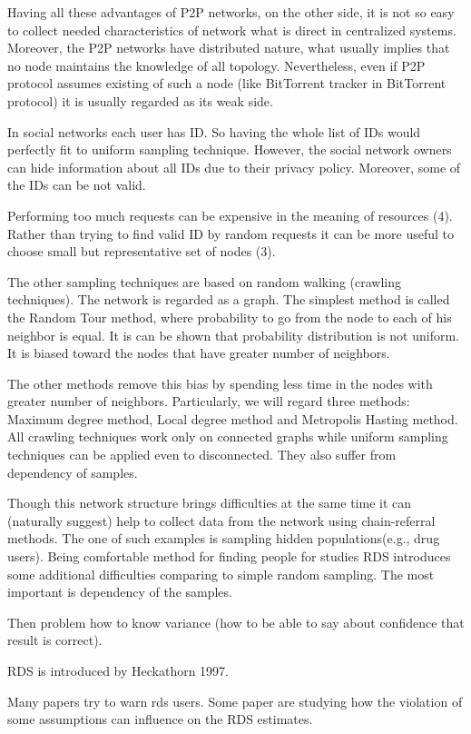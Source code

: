 \documentclass[12pt]{report}
\begin{document}
Having all these advantages of P2P networks, on the other side, it is not so easy to collect needed characteristics of network what is direct in centralized systems. Moreover, the P2P networks have distributed nature, what usually implies that no node maintains the knowledge of all topology. Nevertheless, even if P2P protocol assumes existing of such a node (like BitTorrent tracker in BitTorrent protocol) it is usually regarded as its weak side. 

In social networks each user has ID. So having the whole list of IDs would perfectly fit to uniform sampling technique. However, the social network owners can hide information about all IDs due to their privacy policy. Moreover, some of the IDs can be not valid. 

Performing too much requests can be expensive in the meaning of resources (4). Rather than trying to find valid ID by random requests it can be more useful to choose small but representative set of nodes (3).

The other sampling techniques are based on random walking (crawling techniques). The network is regarded as a graph. The simplest method is called the Random Tour method, where probability to go from the node to each of his neighbor is equal. It is can be shown that probability distribution is not uniform. It is biased toward the nodes that have greater number of neighbors. 

The other methods remove this bias by spending less time in the nodes with greater number of neighbors. Particularly, we will regard three methods: Maximum degree 
method, Local degree method and Metropolis Hasting method. All crawling techniques work only on connected graphs while uniform sampling techniques can be applied even to disconnected. They also suffer from dependency of samples.

Though this network structure brings difficulties at the same time it can (naturally suggest) help to collect data from the network using chain-referral methods.
The one of such examples is sampling hidden populations(e.g., drug users).
Being comfortable method for finding people for studies RDS introduces some additional difficulties comparing to simple random sampling. The most important is dependency of the samples.

Then problem how to know variance (how to be able to say about confidence that result is correct).

RDS is introduced by Heckathorn 1997.

Many papers try to warn rds users.
Some paper are studying how the violation of some assumptions can influence on the RDS estimates.
\end{document}
